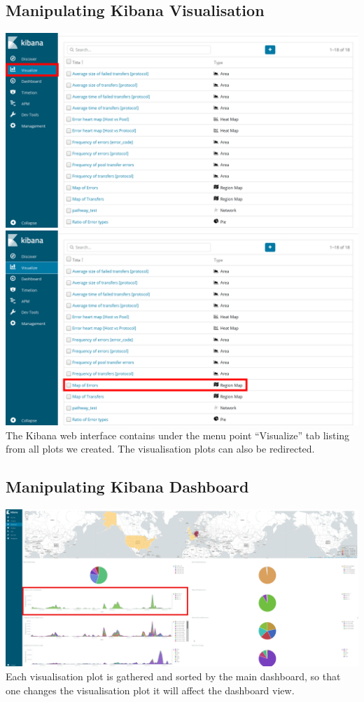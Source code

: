 \documentclass[]{article}
\begin{document}
\subsection{Manipulating Kibana
Visualisation}\label{manipulating-kibana-visualisation}

\includegraphics{images/kibana_vis1.png}
\includegraphics{images/kibana_vis2.png} The Kibana web interface
contains under the menu point ``Visualize'' tab listing from all plots
we created. The visualisation plots can also be redirected.

\subsection{Manipulating Kibana
Dashboard}\label{manipulating-kibana-dashboard}

\includegraphics{images/kibana_main1.png} Each visualisation plot is
gathered and sorted by the main dashboard, so that one changes the
visualisation plot it will affect the dashboard view.
\end{document}
